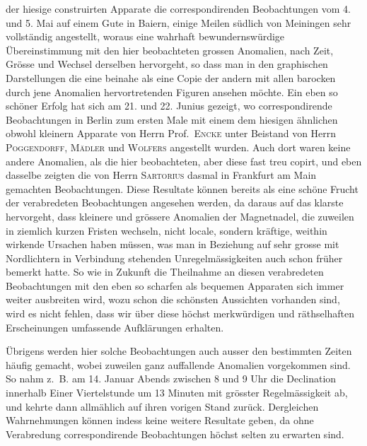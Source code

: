 \noindent der hiesige construirten Apparate die correspondirenden Beobachtungen vom 4. und 5. Mai auf einem Gute in Baiern, einige Meilen südlich von Meiningen sehr vollständig angestellt, woraus eine wahrhaft bewundernswürdige Übereinstimmung mit den hier beobachteten grossen Anomalien, nach Zeit, Grösse und Wechsel derselben hervorgeht, so dass man in den graphischen Darstellungen die eine beinahe als eine Copie der andern mit allen barocken durch jene Anomalien hervortretenden Figuren ansehen möchte. Ein eben so schöner Erfolg hat sich am 21. und 22. Junius gezeigt, wo correspondirende Beobachtungen in Berlin zum ersten Male mit einem dem hiesigen ähnlichen obwohl kleinern Apparate von Herrn Prof.\ \textsc{Encke} unter Beistand von Herrn \textsc{Poggendorff}, \textsc{Mädler} und \textsc{Wolfers} angestellt wurden. Auch dort waren keine andere Anomalien, als die hier beobachteten, aber diese fast treu copirt, und eben dasselbe zeigten die von Herrn \textsc{Sartorius} dasmal in Frankfurt am Main gemachten Beobachtungen. Diese Resultate können bereits als eine schöne Frucht der verabredeten Beobachtungen angesehen werden, da daraus auf das klarste hervorgeht, dass kleinere und grössere Anomalien der Magnetnadel, die zuweilen in ziemlich kurzen Fristen wechseln, nicht locale, sondern kräftige, weithin wirkende Ursachen haben müssen, was man in Beziehung auf sehr grosse mit Nordlichtern in Verbindung stehenden Unregelmässigkeiten auch schon früher bemerkt hatte. So wie in Zukunft die Theilnahme an diesen verabredeten Beobachtungen mit den eben so scharfen als bequemen Apparaten sich immer weiter ausbreiten wird, wozu schon die schönsten Aussichten vorhanden sind, wird es nicht fehlen, dass wir über diese höchst merkwürdigen und räthselhaften Erscheinungen umfassende Aufklärungen erhalten.

Übrigens werden hier solche Beobachtungen auch ausser den bestimmten Zeiten häufig gemacht, wobei zuweilen ganz auffallende Anomalien vorgekommen sind. So nahm z.\ B. am 14. Januar Abends zwischen 8 und 9 Uhr die Declination innerhalb Einer Viertelstunde um 13 Minuten mit grösster Regelmässigkeit ab, und kehrte dann allmählich auf ihren vorigen Stand zurück. Dergleichen Wahrnehmungen können indess keine weitere Resultate geben, da ohne Verabredung correspondirende Beobachtungen höchst selten zu erwarten sind.

